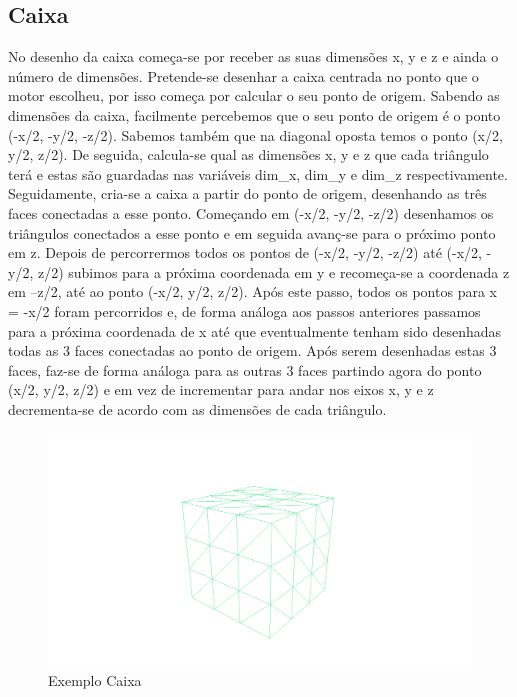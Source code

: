 \documentclass{report}
\begin{document}
\subsection{Caixa}
No desenho da caixa come\c{c}a-se por receber as suas dimens\~oes x, y e z e ainda o n\'umero de dimens\~oes. Pretende-se desenhar a caixa centrada no ponto que o motor escolheu, por isso come\c{c}a por calcular o seu ponto de origem. Sabendo as dimens\~oes da caixa, facilmente percebemos que o seu ponto de origem é o ponto (-x/2, -y/2, -z/2). Sabemos tamb\'em que na diagonal oposta temos o ponto (x/2, y/2, z/2). De seguida, calcula-se qual as dimens\~oes x, y e z que cada tri\^angulo ter\'a e estas s\~ao guardadas nas vari\'aveis dim\_x, dim\_y e dim\_z respectivamente.
Seguidamente, cria-se a caixa a partir do ponto de origem, desenhando as tr\^es faces conectadas a esse ponto. Come\c{c}ando em (-x/2, -y/2, -z/2) desenhamos os tri\^angulos conectados a esse ponto e em seguida avan\c{c}-se para o pr\'oximo ponto em z. Depois de percorrermos todos os pontos de (-x/2, -y/2, -z/2) até (-x/2, -y/2, z/2) subimos para a próxima coordenada em y e recome\c{c}a-se a coordenada z em –z/2, at\'e ao ponto (-x/2, y/2, z/2). Ap\'os este passo, todos os pontos para x = -x/2 foram percorridos e, de forma an\'aloga aos passos anteriores passamos para a pr\'oxima coordenada de x at\'e que eventualmente tenham sido desenhadas todas as 3 faces conectadas ao ponto de origem. Ap\'os serem desenhadas estas 3 faces, faz-se de forma an\'aloga para as outras 3 faces partindo agora do ponto (x/2, y/2, z/2) e em vez de incrementar para andar nos eixos x, y e z decrementa-se de acordo com as dimens\~oes de cada tri\^angulo.

\begin{figure}[h]
\centering
\includegraphics[scale=0.15]{caixa.png}
\caption{Exemplo Caixa}
\end{figure}
\clearpage
\end{document}
